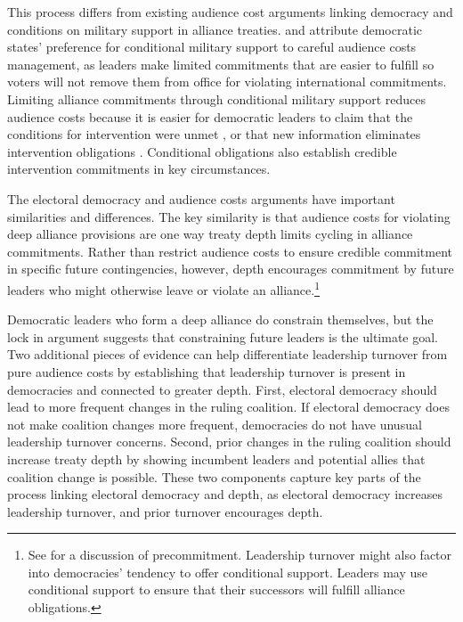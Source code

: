 \documentclass[12pt]{article}
\begin{document}
This process differs from existing audience cost arguments linking democracy and conditions on military support in alliance treaties. 
\citet{Mattes2012} and \citet{Chibaetal2015} attribute democratic states' preference for conditional military support to careful audience costs management, as leaders make limited commitments that are easier to fulfill so voters will not remove them from office for violating international commitments.
Limiting alliance commitments through conditional military support reduces audience costs because it is easier for democratic leaders to claim that the conditions for 
intervention were unmet \citep{FjelstulReiter2019}, or that new information eliminates intervention obligations \citep{LevenduskyHorowitz2012}. 
Conditional obligations also establish credible intervention commitments in key circumstances. 


The electoral democracy and audience costs arguments have important similarities and differences. 
The key similarity is that audience costs for violating deep alliance provisions are one way treaty depth limits cycling in alliance commitments. 
Rather than restrict audience costs to ensure credible commitment in specific future contingencies, however, depth encourages commitment by future leaders who might otherwise leave or violate an alliance.\footnote{See \citet{Mattes2012a} for a discussion of precommitment. Leadership turnover might also factor into democracies' tendency to offer conditional support. Leaders may use conditional support to ensure that their successors will fulfill alliance obligations.} 


Democratic leaders who form a deep alliance do constrain themselves, but the lock in argument suggests that constraining future leaders is the ultimate goal. 
Two additional pieces of evidence can help differentiate leadership turnover from pure audience costs by establishing that leadership turnover is present in democracies and connected to greater depth. 
First, electoral democracy should lead to more frequent changes in the ruling coalition. 
If electoral democracy does not make coalition changes more frequent, democracies do not have unusual leadership turnover concerns. 
Second, prior changes in the ruling coalition should increase treaty depth by showing incumbent leaders and potential allies that coalition change is possible.  
These two components capture key parts of the process linking electoral democracy and depth, as electoral democracy increases leadership turnover, and prior turnover encourages depth. 
\end{document}

